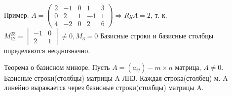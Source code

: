 \documentclass[12pt]{article}
\begin{document}
    Пример. \newline
    $A = \begin{pmatrix}
        2 & -1 & 0 & 1 & 3 \\
        0 & 2 & 1 &-4 & 1 \\
        4 & -2 & 0 & 2 & 6
    \end{pmatrix}
    \Rightarrow Rg A = 2$, т. к. $M_{12}^{23} = \begin{vmatrix}
        -1 & 0 \\
        2 & 1
    \end{vmatrix} \not = 0, M_3 = 0$ \newline
    Базисные строки и базисные столбцы определяются неоднозначно. \newline

    Теорема о базисном миноре. \newline
    Пусть $A = (a_{ij}) - m \times n$ матрица, $A \not = 0$. \newline
    Базисные строки(столбцы) матрицы A ЛНЗ. \newline
    Каждая строка(столбец) м. A линейно выражается через базисные строки(столбцы) матрицы A. \newline
\end{document}
